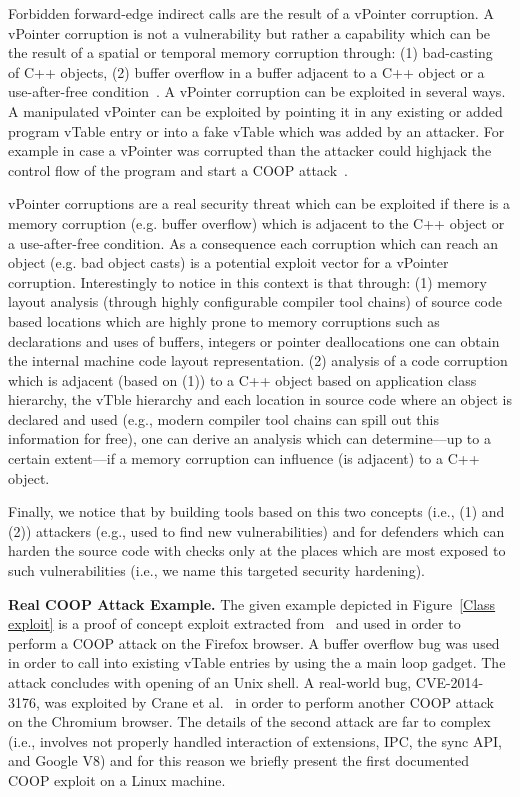 Forbidden forward-edge indirect calls are the result of a vPointer corruption.
A vPointer corruption is not a vulnerability but rather a capability which 
can be the result of a spatial or temporal memory corruption through: 
(1) bad-casting~\cite{byoungyoung:typecasting} of C++ objects, 
(2) buffer overflow in a buffer adjacent to a C++ object or a use-after-free condition~\cite{schuster:coop}.
A vPointer corruption can be exploited in several ways. A manipulated vPointer
can be exploited by pointing it in any existing or added program vTable entry 
or into a fake vTable which was added by an attacker. For example in case a vPointer
was corrupted than the attacker could highjack the control flow of the program 
and start a COOP attack~\cite{schuster:coop}.

vPointer corruptions are a real security threat which can be exploited if there 
is a memory corruption (e.g. buffer overflow) which is adjacent to
the C++ object or a use-after-free condition. As a consequence each corruption 
which can reach an object (e.g. bad object casts) is a potential exploit vector 
for a vPointer corruption. Interestingly to notice in this context is that through:
(1) memory layout analysis (through highly configurable compiler tool chains) of 
source code based locations which are highly prone to
memory corruptions such as declarations and uses of buffers, integers or pointer 
deallocations one can obtain the internal machine code layout representation.
(2) analysis of a code corruption which is adjacent (based on (1)) to a C++ object based on
application class hierarchy, the vTble hierarchy and each location in source code where an object
is declared and used (e.g., modern compiler tool chains can spill out this information for free), 
one can derive an analysis which can determine---up to a certain extent---if a memory corruption 
can influence (is adjacent) to a C++ object.

Finally, we notice that by building tools based on this two concepts (i.e., (1) and (2))
attackers (e.g., used to find new vulnerabilities) and for defenders which can 
harden the source code with checks only at the places which are most exposed 
to such vulnerabilities (i.e., we name this targeted security hardening).

\textbf{Real COOP Attack Example.}
\label{Running Example: CVE X}
The given example depicted in Figure~\ref{Class exploit}
is a proof of concept exploit extracted from~\cite{schuster:coop} and used in order to perform 
a COOP attack on the Firefox browser. A buffer overflow bug was used in order to call 
into existing vTable entries by using the a main loop gadget. 
The attack concludes with opening of an Unix shell. 
A real-world bug, CVE-2014-3176, was exploited by Crane et al.~\cite{crane:readactor++}
in order to perform another COOP attack on the Chromium browser. The details of the 
second attack are far to complex (i.e., involves not properly handled interaction of 
extensions, IPC, the sync API, and Google V8) and for this reason we briefly present the first 
documented COOP exploit on a Linux machine.

